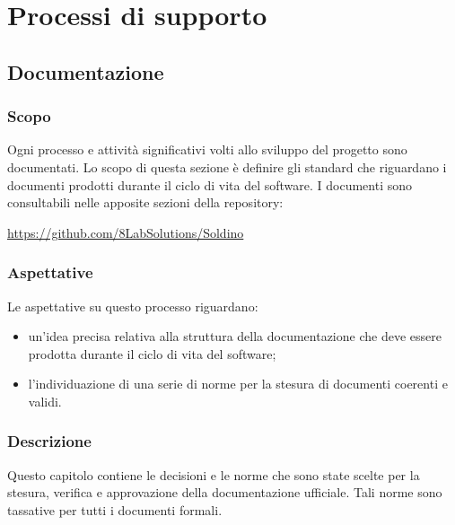 \section{Processi di supporto}
\subsection{Documentazione}
	\subsubsection{Scopo}
	Ogni processo e attività significativi volti allo sviluppo del progetto sono documentati. Lo scopo di questa sezione è definire gli standard che riguardano i documenti prodotti durante il ciclo di vita del software.
	I documenti sono consultabili nelle apposite sezioni della repository\glo:\\
	\centerline{\url{https://github.com/8LabSolutions/Soldino}} 		
	\subsubsection{Aspettative}
	Le aspettative su questo processo riguardano:
	\begin{itemize}
		\item un'idea precisa relativa alla struttura della documentazione che deve essere prodotta durante il ciclo di vita del software;
		\item l'individuazione di una serie di norme per la stesura di documenti coerenti e validi.
	\end{itemize}
	\subsubsection{Descrizione}
	Questo capitolo contiene le decisioni e le norme che sono state scelte per la
	stesura, verifica e approvazione della documentazione ufficiale.  Tali norme  sono  tassative  per  tutti  i  documenti  formali.
